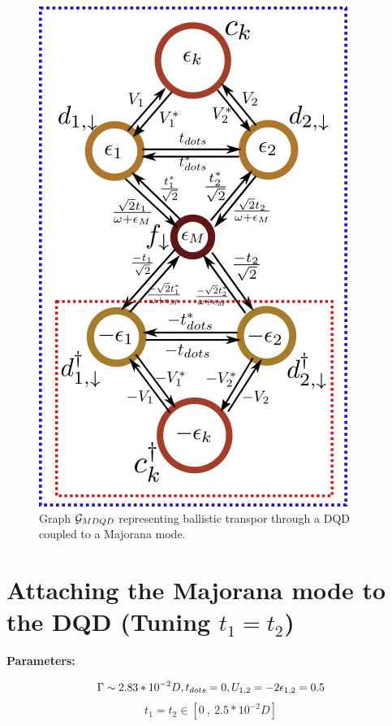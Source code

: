 \begin{figure}[H]
\centering
\includegraphics[scale=0.68]{IMAGES/Graphs/DQD-Majorana.png}
\caption{\label{fig:Graph-MDQD} Graph $\mathcal{G}_{MDQD}$ representing ballistic transpor through a DQD coupled to a Majorana mode. } 
\end{figure}



\newpage



\section{Attaching the Majorana mode to the DQD (Tuning $t_1=t_2$) \label{sec:t1=t2}}

\textbf{Parameters:}

$$\Gamma \sim 2.83*10^{-2}D, t_{dots}=0 , U_{1,2} = -2\epsilon_{1,2} = 0.5$$
$$t_1=t_2 \in [0\  ,\  2.5*10^{-2}D]$$

